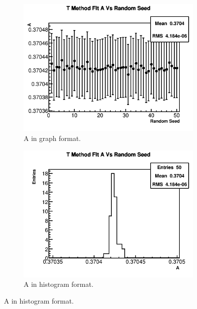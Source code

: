 	\begin{figure}[]
	\centering
	    \begin{subfigure}[t]{0.45\textwidth}
		    \centering
			\includegraphics[width=\textwidth]{TMethod_A_Vs_Iter_Canv}
		    \caption{A in graph format.}
	    \end{subfigure}
	    \hspace{4mm}
	    \begin{subfigure}[t]{0.45\textwidth}
		    \centering
			\includegraphics[width=\textwidth]{TMethod_A_Vs_Iter_Canv_hist}
		    \caption{A in histogram format.}
	    \end{subfigure}%
	   	\vspace{4mm}

\end{figure}
